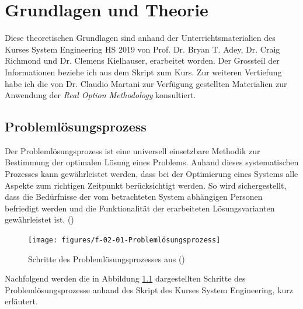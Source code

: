 %
%            
%
%
%

\chapter{Grundlagen und Theorie}
\label{chap:Grundlage}

Diese theoretischen Grundlagen sind anhand der Unterrichtsmaterialien des Kurses System Engineering HS 2019 von Prof. Dr. Bryan T. Adey, Dr. Craig Richmond und Dr. Clemens Kielhauser, erarbeitet worden. Der Grossteil der Informationen beziehe ich aus dem Skript zum Kurs. Zur weiteren Vertiefung habe ich die von Dr. Claudio Martani zur Verfügung gestellten Materialien zur Anwendung der \textit{Real Option Methodology} konsultiert.  

\section{Problemlösungsprozess}
\label{sec:Problemprozess}

Der Problemlösungsprozess ist eine universell einsetzbare Methodik zur Bestimmung der optimalen Lösung eines Problems. Anhand dieses systematischen Prozesses kann gewährleistet werden, dass bei der Optimierung eines Systems alle Aspekte zum richtigen Zeitpunkt berücksichtigt werden. So wird sichergestellt, dass die Bedürfnisse der vom betrachteten System abhängigen Personen befriedigt werden und die Funktionalität der erarbeiteten Lösungsvarianten gewährleistet ist. (\cite{Adey2019}) 

\begin{figure}[h!]
	\centering
	\texttt{[image: figures/f-02-01-Problemlösungsprozess]}
	\caption[Schritte des Problemlösungsprozesses]{Schritte des Problemlösungsprozesses aus (\cite{Adey2019})}
	\label{img:Problemlösung}
\end{figure}

Nachfolgend werden die in Abbildung \ref{img:Problemlösung} dargestellten Schritte des Problemlösungsprozesse anhand des Skript des Kurses System Engineering, kurz erläutert. 

